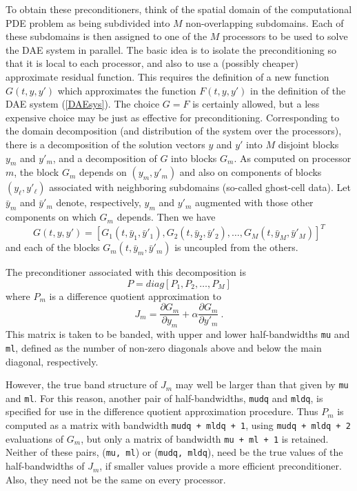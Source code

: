 To obtain these preconditioners, think of the spatial domain of the
computational PDE problem as being subdivided into $M$ non-overlapping
subdomains.  Each of these subdomains is then assigned to one of the
$M$ processors to be used to solve the DAE system in parallel. The
basic idea is to isolate the preconditioning so that it is local to
each processor, and also to use a (possibly cheaper) approximate
residual function. This requires the definition of a new function
$G(t,y,y')$ which approximates the function $F(t,y,y')$ in the
definition of the DAE system (\ref{DAEsys}).  The choice $G = F$ is
certainly allowed, but a less expensive choice may be just as
effective for preconditioning.  Corresponding to the domain
decomposition (and distribution of the system over the processors),
there is a decomposition of the solution vectors $y$ and $y'$ into $M$
disjoint blocks $y_m$ and $y'_m$, and a decomposition of $G$ into blocks
$G_m$.  As computed on processor $m$, the block $G_m$ depends on
$(y_m,y'_m)$ and also on components of blocks $(y_{\ell},y'_{\ell})$
associated with neighboring subdomains (so-called ghost-cell data).
Let $\bar{y}_m$ and $\bar{y}'_m$ denote, respectively, $y_m$ and
$y'_m$ augmented with those other components on which $G_m$ depends.
Then we have
\[
G(t,y,y') = [G_1(t,\bar{y}_1,\bar{y}'_1), G_2(t,\bar{y}_2,\bar{y}'_2),
              \ldots, G_M(t,\bar{y}_M,\bar{y}'_M)]^T
\]
and each of the blocks $G_m(t,\bar{y}_m,\bar{y}'_m)$ is uncoupled from
the others.

The preconditioner associated with this decomposition is
\[
P = diag[P_1, P_2, \ldots, P_M]
\]
where 
$P_m$ is a difference quotient approximation to 
\[
  J_m = \frac{\partial G_m}{\partial y_m} + 
           \alpha \frac{\partial G_m}{\partial y'_m} ~. 
\]
This matrix is taken to be banded, with upper and lower
half-bandwidths {\tt mu} and {\tt ml}, defined as the number of
non-zero diagonals above and below the main diagonal,
respectively. 

However, the true band structure of $J_m$ may well be larger than
that given by {\tt mu} and {\tt ml}.  For this reason, another pair of
half-bandwidths, {\tt mudq} and {\tt mldq}, is specified for use in
the difference quotient approximation procedure.  Thus $P_m$ is
computed as a matrix with bandwidth {\tt mudq + mldq + 1}, using 
{\tt mudq + mldq + 2} evaluations of $G_m$, but only a matrix of
bandwidth {\tt mu + ml + 1} is retained.  Neither of these pairs,
({\tt mu, ml}) or ({\tt mudq, mldq}), need be the true values of the
half-bandwidths of $J_m$, if smaller values provide a more efficient
preconditioner.  Also, they need not be the same on every processor.

